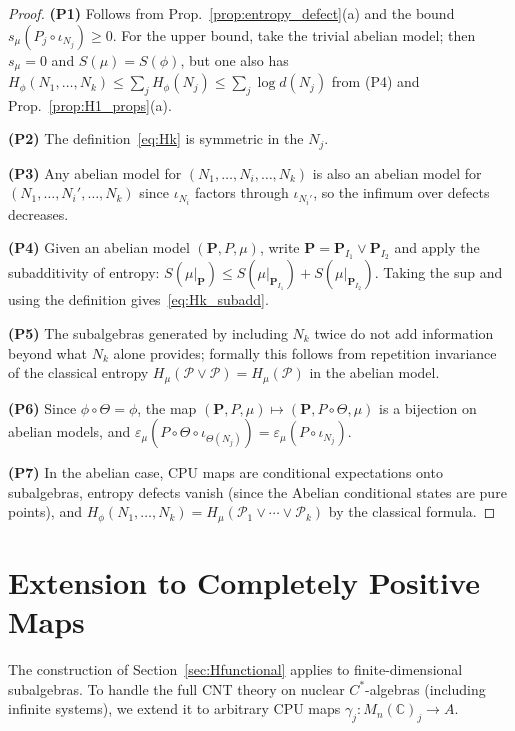 \documentclass[12pt,a4paper]{article}
\newcommand{\CC}{\mathbb{C}}
\newcommand{\Mn}{M_n(\CC)}
\newcommand{\thetaaut}{\Theta}
\newcommand{\Hphi}{H_{\phi}}
\newcommand{\eps}{\varepsilon}
\begin{document}
\begin{proof}
\textbf{(P1)} Follows from Prop.~\ref{prop:entropy_defect}(a) and the bound
$s_\mu(P_j\circ\iota_{N_j})\ge 0$.
For the upper bound, take the trivial abelian model; then $s_\mu=0$ and
$S(\mu)=S(\phi)$, but one also has
$\Hphi(N_1,\ldots,N_k)\le\sum_j\Hphi(N_j)\le\sum_j\log d(N_j)$
from (P4) and Prop.~\ref{prop:H1_props}(a).

\textbf{(P2)} The definition~\eqref{eq:Hk} is symmetric in the $N_j$.

\textbf{(P3)} Any abelian model for $(N_1,\ldots,N_i,\ldots,N_k)$ is also an abelian
model for $(N_1,\ldots,N_i',\ldots,N_k)$ since $\iota_{N_i}$ factors through $\iota_{N_i'}$,
so the infimum over defects decreases.

\textbf{(P4)} Given an abelian model $(\mathbf{P},P,\mu)$, write
$\mathbf{P}=\mathbf{P}_{I_1}\vee\mathbf{P}_{I_2}$ and apply the subadditivity of entropy:
$S(\mu|_\mathbf{P})\le S(\mu|_{\mathbf{P}_{I_1}})+S(\mu|_{\mathbf{P}_{I_2}})$.
Taking the sup and using the definition gives~\eqref{eq:Hk_subadd}.

\textbf{(P5)} The subalgebras generated by including $N_k$ twice do not add information
beyond what $N_k$ alone provides; formally this follows from repetition invariance
of the classical entropy $H_\mu(\mathcal{P}\vee\mathcal{P})=H_\mu(\mathcal{P})$ in the abelian model.

\textbf{(P6)} Since $\phi\circ\thetaaut=\phi$, the map $(\mathbf{P},P,\mu)\mapsto(\mathbf{P},P\circ\thetaaut,\mu)$
is a bijection on abelian models, and $\eps_\mu(P\circ\thetaaut\circ\iota_{\thetaaut(N_j)})=
\eps_\mu(P\circ\iota_{N_j})$.

\textbf{(P7)} In the abelian case, CPU maps are conditional expectations onto subalgebras,
entropy defects vanish (since the Abelian conditional states are pure points), and
$\Hphi(N_1,\ldots,N_k)=H_\mu(\mathcal{P}_1\vee\cdots\vee\mathcal{P}_k)$ by the
classical formula.
\end{proof}

\section{Extension to Completely Positive Maps}
\label{sec:cpmaps}

The construction of Section~\ref{sec:Hfunctional} applies to finite-dimensional subalgebras.
To handle the full CNT theory on nuclear $C^*$-algebras (including infinite systems),
we extend it to arbitrary CPU maps $\gamma_j:\Mn_j\to A$.
\end{document}
